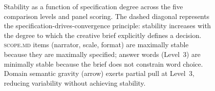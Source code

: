 \begin{figure}[t]
\begin{tikzpicture}
  \end{tikzpicture}

  \caption{Stability as a function of specification degree across the five
  comparison levels and panel scoring. The dashed diagonal represents the
  specification-drives-convergence principle: stability increases with the
  degree to which the creative brief explicitly defines a decision.
  \textsc{scope.md} items (narrator, scale, format) are maximally stable
  because they are maximally specified; answer words (Level~3) are minimally
  stable because the brief does not constrain word choice. Domain semantic
  gravity (arrow) exerts partial pull at Level~3, reducing variability without
  achieving stability.}
  \label{fig:structure}
\end{figure}
